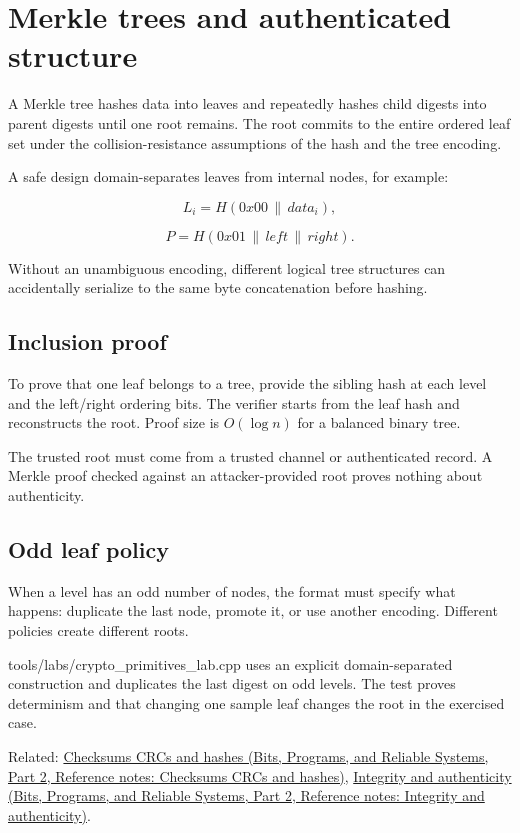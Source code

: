 \hypertarget{appendix-098192f8d46d}{}\label{referencestart:appendix-098192f8d46d}
\section{Merkle trees and authenticated structure}\label{appendix-098192f8d46d-merkle-trees-and-authenticated-structure}

\hypertarget{appendix-098192f8d46d-merkle-trees-and-authenticated-structure}{}

A Merkle tree hashes data into leaves and repeatedly hashes child digests into parent digests until one root remains. The root commits to the entire ordered leaf set under the collision-resistance assumptions of the hash and the tree encoding.

A safe design domain-separates leaves from internal nodes, for example:

\[
L_i=H(0x00\,\|\,data_i),
\]

\[
P=H(0x01\,\|\,left\,\|\,right).
\]

Without an unambiguous encoding, different logical tree structures can accidentally serialize to the same byte concatenation before hashing.

\subsection{Inclusion proof}\label{appendix-098192f8d46d-inclusion-proof}

\hypertarget{appendix-098192f8d46d-inclusion-proof}{}

To prove that one leaf belongs to a tree, provide the sibling hash at each level and the left/right ordering bits. The verifier starts from the leaf hash and reconstructs the root. Proof size is \(O(\log n)\) for a balanced binary tree.

The trusted root must come from a trusted channel or authenticated record. A Merkle proof checked against an attacker-provided root proves nothing about authenticity.

\subsection{Odd leaf policy}\label{appendix-098192f8d46d-odd-leaf-policy}

\hypertarget{appendix-098192f8d46d-odd-leaf-policy}{}

When a level has an odd number of nodes, the format must specify what happens: duplicate the last node, promote it, or use another encoding. Different policies create different roots.

tools/labs/crypto\_primitives\_lab.cpp uses an explicit domain-separated construction and duplicates the last digest on odd levels. The test proves determinism and that changing one sample leaf changes the root in the exercised case.

Related: \href{../01-Bits-Programs-and-Reliable-Systems-P02/main.pdf\#appendix-ed338677de0a}{Checksums CRCs and hashes (Bits, Programs, and Reliable Systems, Part 2, Reference notes: Checksums CRCs and hashes)}, \href{../01-Bits-Programs-and-Reliable-Systems-P02/main.pdf\#appendix-cbe594d1ab0a}{Integrity and authenticity (Bits, Programs, and Reliable Systems, Part 2, Reference notes: Integrity and authenticity)}.
